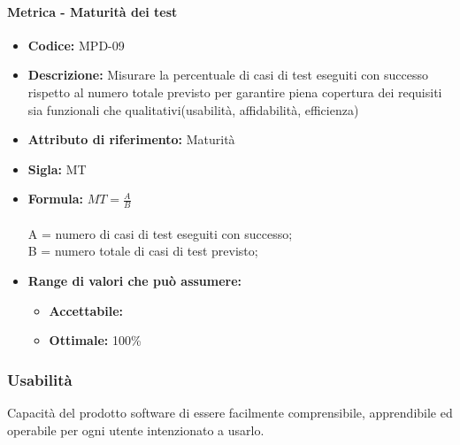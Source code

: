        
                  \paragraph{Metrica - Maturità dei test} 
            \begin{itemize}
           \item   \textbf{Codice:} MPD-09
            \item  \textbf{Descrizione:} Misurare la percentuale di casi di test eseguiti con successo rispetto al numero totale previsto per garantire piena copertura dei requisiti sia funzionali che qualitativi(usabilità, affidabilità, efficienza)
              \item   \textbf{Attributo di riferimento:} Maturità
          \item    \textbf{Sigla:} MT
           \item   \textbf{Formula:} \begin{math}MT = \frac{A}{B}\end{math}\\ \\
            A = numero di casi di test eseguiti con successo;\\
            B = numero totale di casi di test previsto;
            \item \textbf{Range di valori che può assumere:}
        \begin{itemize}
            \item \textbf{Accettabile:} 
            \item \textbf{Ottimale:} 100\%
        \end{itemize}
       \end{itemize}
       
              \subsubsection{Usabilità}
   Capacità del prodotto software di essere facilmente comprensibile, apprendibile ed operabile per ogni utente intenzionato a usarlo.
   
